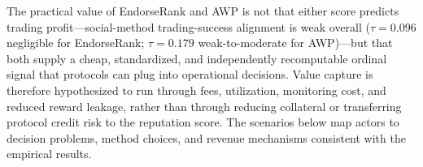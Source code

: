 
The practical value of EndorseRank and AWP is not that either score predicts trading profit---social-method trading-success alignment is weak overall ($\tau=0.096$ negligible for EndorseRank; $\tau=0.179$ weak-to-moderate for AWP)---but that both supply a cheap, standardized, and independently recomputable ordinal signal that protocols can plug into operational decisions. Value capture is therefore hypothesized to run through fees, utilization, monitoring cost, and reduced reward leakage, rather than through reducing collateral or transferring protocol credit risk to the reputation score. The scenarios below map actors to decision problems, method choices, and revenue mechanisms consistent with the empirical results.


